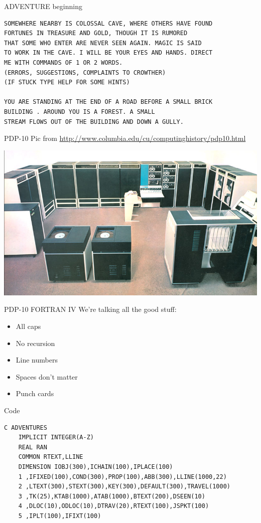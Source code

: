\documentclass{beamer}
\def\fortran{
  \lstset{
     language=[77]FORTRAN,
     keywordstyle=\bfseries,
     extendedchars=true,
     basicstyle=\footnotesize\ttfamily,
     showstringspaces=false,
     showspaces=false,
     numbersep=9pt,
     tabsize=8,
     breaklines=true,
     showtabs=false,
     captionpos=b
  }
}
\begin{document}
\begin{frame}[fragile]{ADVENTURE beginning}

\begin{verbatim}
SOMEWHERE NEARBY IS COLOSSAL CAVE, WHERE OTHERS HAVE FOUND
FORTUNES IN TREASURE AND GOLD, THOUGH IT IS RUMORED
THAT SOME WHO ENTER ARE NEVER SEEN AGAIN. MAGIC IS SAID
TO WORK IN THE CAVE. I WILL BE YOUR EYES AND HANDS. DIRECT
ME WITH COMMANDS OF 1 OR 2 WORDS.
(ERRORS, SUGGESTIONS, COMPLAINTS TO CROWTHER)
(IF STUCK TYPE HELP FOR SOME HINTS)

YOU ARE STANDING AT THE END OF A ROAD BEFORE A SMALL BRICK
BUILDING . AROUND YOU IS A FOREST. A SMALL
STREAM FLOWS OUT OF THE BUILDING AND DOWN A GULLY.
\end{verbatim}

\end{frame}

\begin{frame}{PDP-10}
Pic from \url{http://www.columbia.edu/cu/computinghistory/pdp10.html}

\begin{center}
  \includegraphics[width=.75\textwidth]{ka10.jpg}
\end{center}
\end{frame}
\begin{frame}{PDP-10 FORTRAN IV}
  We're talking all the good stuff:

\begin{itemize}
  \item All caps
  \item No recursion
  \item Line numbers
  \item Spaces don't matter
  \item Punch cards
\end{itemize}

\end{frame}
\begin{frame}[fragile]{Code}

\fortran
\begin{lstlisting}
C ADVENTURES
	IMPLICIT INTEGER(A-Z)
	REAL RAN
	COMMON RTEXT,LLINE
	DIMENSION IOBJ(300),ICHAIN(100),IPLACE(100)
	1 ,IFIXED(100),COND(300),PROP(100),ABB(300),LLINE(1000,22)
	2 ,LTEXT(300),STEXT(300),KEY(300),DEFAULT(300),TRAVEL(1000)
	3 ,TK(25),KTAB(1000),ATAB(1000),BTEXT(200),DSEEN(10)
	4 ,DLOC(10),ODLOC(10),DTRAV(20),RTEXT(100),JSPKT(100)
	5 ,IPLT(100),IFIXT(100)
\end{lstlisting}

\end{frame}
\end{document}
